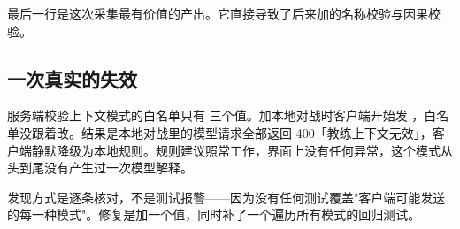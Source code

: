 最后一行是这次采集最有价值的产出。它直接导致了后来加的名称校验与因果校验。

\subsection{一次真实的失效}

服务端校验上下文模式的白名单只有  三个值。加本地对战时客户端开始发 ，白名单没跟着改。结果是本地对战里的模型请求全部返回 400「教练上下文无效」，客户端静默降级为本地规则。规则建议照常工作，界面上没有任何异常，这个模式从头到尾没有产生过一次模型解释。

发现方式是逐条核对，不是测试报警——因为没有任何测试覆盖"客户端可能发送的每一种模式"。修复是加一个值，同时补了一个遍历所有模式的回归测试。
